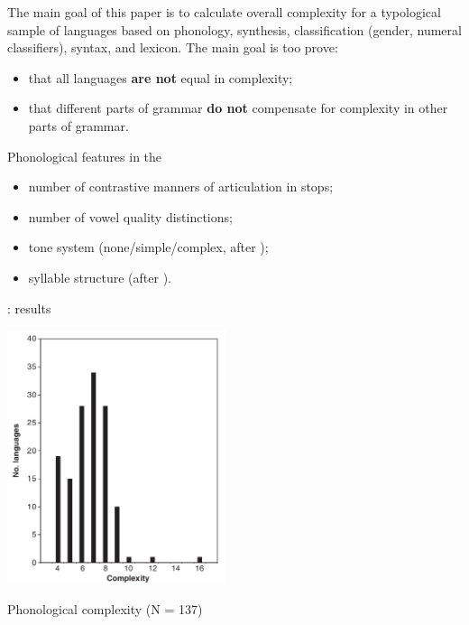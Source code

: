 \documentclass[
  ignorenonframetext,
]{beamer}
\providecommand{\tightlist}{%
  \setlength{\itemsep}{0pt}\setlength{\parskip}{0pt}}
\begin{document}
\begin{frame}{\citep{nichols09}}
\protect\hypertarget{nichols09}{}
The main goal of this paper is to calculate overall complexity for a
typological sample of languages based on phonology, synthesis,
classification (gender, numeral classifiers), syntax, and lexicon. The
main goal is too prove:

\begin{itemize}
\tightlist
\item
  that all languages \textbf{are not} equal in complexity;
\item
  that different parts of grammar \textbf{do not} compensate for
  complexity in other parts of grammar. \pause
\end{itemize}

\begin{block}{Phonological features in the}
\protect\hypertarget{phonological-features-in-the}{}
\begin{itemize}
\tightlist
\item
  number of contrastive manners of articulation in stops;
\item
  number of vowel quality distinctions;
\item
  tone system (none/simple/complex, after \citep{maddieson13b});
\item
  syllable structure (after \citep{maddieson13a}).
\end{itemize}
\end{block}
\end{frame}

\begin{frame}{\citep[116]{nichols09}: results}
\protect\hypertarget{nichols09-116-results}{}
\begin{center}\includegraphics[width=2.52in]{images/nichols09} \end{center}

Phonological complexity (N = 137)
\end{frame}
\end{document}
